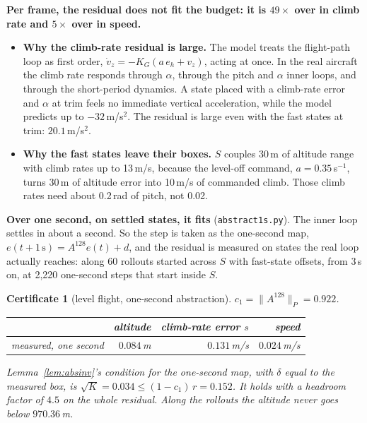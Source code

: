 \documentclass[11pt]{article}
\newtheorem{cert}{Certificate}
\begin{document}
\textbf{Per frame, the residual does not fit the budget: it is $49\times$ over in climb rate and $5\times$ over in speed.}
\begin{itemize}
\item \textbf{Why the climb-rate residual is large.} The model treats the flight-path loop as first order, $\dot v_z = -K_G(a\,e_h + v_z)$, acting at once. In the real aircraft the climb rate responds through $\alpha$, through the pitch and $\alpha$ inner loops, and through the short-period dynamics. A state placed with a climb-rate error and $\alpha$ at trim feels no immediate vertical acceleration, while the model predicts up to $-32$\,m/s$^2$. The residual is large even with the fast states at trim: $20.1$\,m/s$^2$.
\item \textbf{Why the fast states leave their boxes.} $S$ couples 30\,m of altitude range with climb rates up to 13\,m/s, because the level-off command, $a = 0.35$\,s$^{-1}$, turns 30\,m of altitude error into 10\,m/s of commanded climb. Those climb rates need about 0.2\,rad of pitch, not 0.02.
\end{itemize}

\textbf{Over one second, on settled states, it fits} (\texttt{abstract1s.py}). The inner loop settles in about a second. So the step is taken as the one-second map, $e(t+1\,\mathrm{s}) = A^{128}e(t) + d$, and the residual is measured on states the real loop actually reaches: along 60 rollouts started across $S$ with fast-state offsets, from 3\,s on, at 2{,}220 one-second steps that start inside $S$.

\begin{cert}[level flight, one-second abstraction]\label{cert:abstract1s}
$c_1 = \|A^{128}\|_P = 0.922$.

\begin{center}
\begin{tabular}{lrrr}
\toprule
& altitude & climb-rate error $s$ & speed\\
\midrule
measured, one second & $0.084$\,m & $0.131$\,m/s & $0.024$\,m/s\\
\bottomrule
\end{tabular}
\end{center}

Lemma~\ref{lem:absinv}'s condition for the one-second map, with $\delta$ equal to the measured box, is $\sqrt{K} = 0.034 \le (1 - c_1)\,r = 0.152$. It holds with a headroom factor of $4.5$ on the whole residual. Along the rollouts the altitude never goes below $970.36$\,m.
\end{cert}
\end{document}
